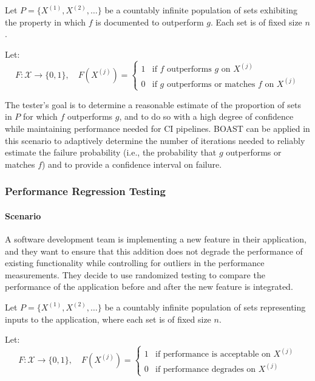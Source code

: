 Let $P = \{ X^{(1)}, X^{(2)}, \dots \}$ be a countably infinite population of sets exhibiting the property in which $f$ is documented to outperform $g$. Each set is of fixed size $n$.

Let:
    \[
        F : \mathcal{X} \to \{0,1\}, \quad F(X^{(j)}) =
        \begin{cases}
        1 & \text{if } f \text{ outperforms } g \text{ on } X^{(j)} \\
        0 & \text{if } g \text{ outperforms or matches } f \text{ on } X^{(j)}
        \end{cases}
    \]

The tester's goal is to determine a reasonable estimate of the proportion of sets in $P$ for which $f$ outperforms $g$, and to do so with a high degree of confidence while maintaining performance needed for CI pipelines. BOAST can be applied in this scenario to adaptively determine the number of iterations needed to reliably estimate the failure probability (i.e., the probability that $g$ outperforms or matches $f$) and to provide a confidence interval on failure.

\subsubsection{Performance Regression Testing}

\paragraph{Scenario} A software development team is implementing a new feature in their application, and they want to ensure that this addition does not degrade the performance of existing functionality while controlling for outliers in the performance measurements. They decide to use randomized testing to compare the performance of the application before and after the new feature is integrated.

Let $P = \{ X^{(1)}, X^{(2)}, \dots \}$ be a countably infinite population of sets representing inputs to the application, where each set is of fixed size $n$.

Let:
    \[
        F : \mathcal{X} \to \{0,1\}, \quad F(X^{(j)}) =
        \begin{cases}
        1 & \text{if performance is acceptable on } X^{(j)} \\
        0 & \text{if performance degrades on } X^{(j)}
        \end{cases}
    \]

